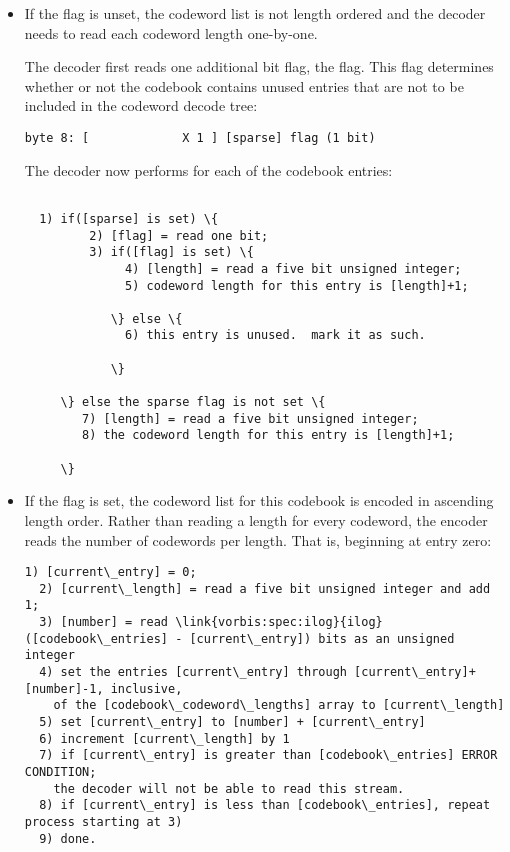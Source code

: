 \begin{itemize}
\item
  If the \varname{[ordered]} flag is unset, the codeword list is not
  length ordered and the decoder needs to read each codeword length
  one-by-one.

  The decoder first reads one additional bit flag, the
  \varname{[sparse]} flag.  This flag determines whether or not the
  codebook contains unused entries that are not to be included in the
  codeword decode tree:

\begin{Verbatim}[commandchars=\\\{\}]
byte 8: [             X 1 ] [sparse] flag (1 bit)
\end{Verbatim}

  The decoder now performs for each of the 
  codebook entries:

\begin{Verbatim}[commandchars=\\\{\}]

  1) if([sparse] is set) \{
         2) [flag] = read one bit;
         3) if([flag] is set) \{
              4) [length] = read a five bit unsigned integer;
              5) codeword length for this entry is [length]+1;

            \} else \{
              6) this entry is unused.  mark it as such.

            \}

     \} else the sparse flag is not set \{
        7) [length] = read a five bit unsigned integer;
        8) the codeword length for this entry is [length]+1;

     \}

\end{Verbatim}

\item
  If the \varname{[ordered]} flag is set, the codeword list for this
  codebook is encoded in ascending length order.  Rather than reading
  a length for every codeword, the encoder reads the number of
  codewords per length.  That is, beginning at entry zero:

\begin{Verbatim}[commandchars=\\\{\}]
  1) [current\_entry] = 0;
  2) [current\_length] = read a five bit unsigned integer and add 1;
  3) [number] = read \link{vorbis:spec:ilog}{ilog}([codebook\_entries] - [current\_entry]) bits as an unsigned integer
  4) set the entries [current\_entry] through [current\_entry]+[number]-1, inclusive,
    of the [codebook\_codeword\_lengths] array to [current\_length]
  5) set [current\_entry] to [number] + [current\_entry]
  6) increment [current\_length] by 1
  7) if [current\_entry] is greater than [codebook\_entries] ERROR CONDITION;
    the decoder will not be able to read this stream.
  8) if [current\_entry] is less than [codebook\_entries], repeat process starting at 3)
  9) done.
\end{Verbatim}

\end{itemize}


